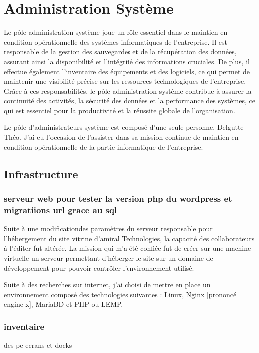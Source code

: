 \section{Administration Système}
Le pôle administration système joue un rôle essentiel dans le maintien en condition opérationnelle des systèmes informatiques de l'entreprise.
Il est responsable de la gestion des sauvegardes et de la récupération des données, assurant ainsi la disponibilité et l'intégrité des informations cruciales.
De plus, il effectue également l'inventaire des équipements et des logiciels, ce qui permet de maintenir une visibilité précise sur les ressources technologiques de l'entreprise.
Grâce à ces responsabilités, le pôle administration système contribue à assurer la continuité des activités, la sécurité des données et la performance des systèmes, ce qui est essentiel pour la productivité et la réussite globale de l'organisation.

Le pôle d'administrateurs système est composé d'une seule personne, Delgutte Théo.
J'ai eu l'occasion de l'assister dans sa mission continue de maintien en condition opérationnelle de la partie informatique de l'entreprise.

\subsection{Infrastructure}
\subsubsection{serveur web pour tester la version php du wordpress et migratiions url grace au sql}
Suite à une modificationdes paramètres du serveur responsable pour l'hébergement du site vitrine d'amiral Technologies, la capacité des collaborateurs à l'éditer fut altérée.
La mission qui m'a été confiée fut de créer sur une machine virtuelle un serveur permettant d'héberger le site sur un domaine de développement pour pouvoir contrôler l'environnement utilisé.

Suite à des recherches sur internet, j'ai choisi de mettre en place un environnement composé des technologies suivantes : Linux, Nginx [prononcé engine-x], MariaBD et PHP ou LEMP.


\subsubsection{inventaire}
des pc ecrans et docks

